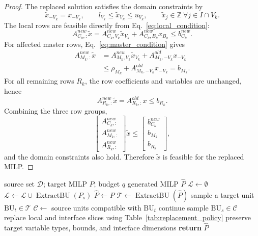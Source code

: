 \documentclass[letterpaper]{article}
\newcommand{\method}{\textbf{GraphBU}\xspace}
\begin{document}
\begin{proof}
The replaced solution satisfies the domain constraints by
\begin{equation}
\tilde{x}_{-V_k}=x_{-V_k},
\qquad
l_{V_k}\le \tilde{x}_{V_k}\le u_{V_k},
\qquad
\tilde{x}_j\in\mathbb{Z}\ \forall j\in I\cap V_k .
\end{equation}
The local rows are feasible directly from Eq.~\eqref{eq:local_condition}:
\begin{equation}
A^{new}_{C_k,:}\tilde{x}
=
A^{new}_{C_k,V_k}\tilde{x}_{V_k}
+A^{new}_{C_k,B_k}x_{B_k}
\le b^{new}_{C_k}.
\end{equation}
For affected master rows, Eq.~\eqref{eq:master_condition} gives
\begin{equation}
\begin{aligned}
A^{new}_{M_k,:}\tilde{x}
&=
A^{new}_{M_k,V_k}\tilde{x}_{V_k}
+A^{old}_{M_k,-V_k}x_{-V_k}\\
&\le
\rho_{M_k}
+A^{old}_{M_k,-V_k}x_{-V_k}
= b_{M_k}.
\end{aligned}
\end{equation}
For all remaining rows $R_k$, the row coefficients and variables are unchanged, hence
\begin{equation}
A^{new}_{R_k,:}\tilde{x}
=
A^{old}_{R_k,:}x
\le b_{R_k}.
\end{equation}
Combining the three row groups,
\begin{equation}
\begin{bmatrix}
A^{new}_{C_k,:}\\
A^{new}_{M_k,:}\\
A^{new}_{R_k,:}
\end{bmatrix}
\tilde{x}
\le
\begin{bmatrix}
b^{new}_{C_k}\\
b_{M_k}\\
b_{R_k}
\end{bmatrix},
\end{equation}
and the domain constraints also hold. Therefore $\tilde{x}$ is feasible for the replaced MILP.
\end{proof}

\begin{algorithm}[t]
\caption{\method block-unit generation}
\label{alg:graphbu}
\small
\begin{algorithmic}[1]
\REQUIRE source set $\mathcal{D}$; target MILP $P$; budget $q$
\ENSURE generated MILP $\hat P$
\STATE $\mathcal{L}\leftarrow\emptyset$
    \STATE $\mathcal{L}\leftarrow\mathcal{L}\cup\operatorname{ExtractBU}(P_s)$
\ENDFOR
\STATE $\hat P\leftarrow P$
\STATE $\mathcal{T}\leftarrow\operatorname{ExtractBU}(\hat P)$
    \STATE sample a target unit $\mathrm{BU}_t\in\mathcal{T}$
    \STATE $\mathcal{C}\leftarrow$ source units compatible with $\mathrm{BU}_t$
        \STATE continue
    \ENDIF
    \STATE sample $\mathrm{BU}_s\in\mathcal{C}$
    \STATE replace local and interface slices using Table~\ref{tab:replacement_policy}
    \STATE preserve target variable types, bounds, and interface dimensions
\ENDFOR
\STATE \textbf{return} $\hat P$
\end{algorithmic}
\end{algorithm}
\end{document}

